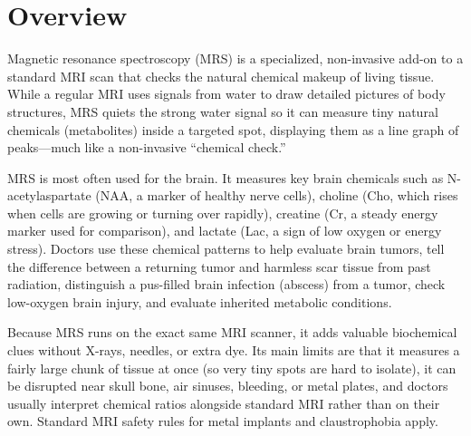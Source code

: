 \label{ch:infographic-mrs}

\section{Overview}

Magnetic resonance spectroscopy (MRS) is a specialized, non-invasive add-on to a standard MRI scan that checks the natural chemical makeup of living tissue. While a regular MRI uses signals from water to draw detailed pictures of body structures, MRS quiets the strong water signal so it can measure tiny natural chemicals (metabolites) inside a targeted spot, displaying them as a line graph of peaks---much like a non-invasive ``chemical check.''

MRS is most often used for the brain. It measures key brain chemicals such as N-acetylaspartate (NAA, a marker of healthy nerve cells), choline (Cho, which rises when cells are growing or turning over rapidly), creatine (Cr, a steady energy marker used for comparison), and lactate (Lac, a sign of low oxygen or energy stress). Doctors use these chemical patterns to help evaluate brain tumors, tell the difference between a returning tumor and harmless scar tissue from past radiation, distinguish a pus-filled brain infection (abscess) from a tumor, check low-oxygen brain injury, and evaluate inherited metabolic conditions.

Because MRS runs on the exact same MRI scanner, it adds valuable biochemical clues without X-rays, needles, or extra dye. Its main limits are that it measures a fairly large chunk of tissue at once (so very tiny spots are hard to isolate), it can be disrupted near skull bone, air sinuses, bleeding, or metal plates, and doctors usually interpret chemical ratios alongside standard MRI rather than on their own. Standard MRI safety rules for metal implants and claustrophobia apply.

